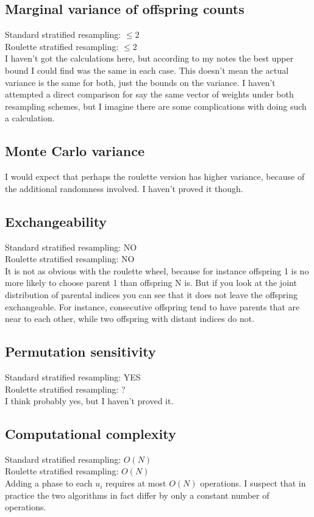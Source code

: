 \documentclass[fleqn]{article}
\newcommand{\1}[1]{\mathbb{I}_{#1}}
\begin{document}
\subsection*{Marginal variance of offspring counts}
Standard stratified resampling: $\leq 2$\\
Roulette stratified resampling: $\leq 2$\\[5pt]
I haven't got the calculations here, but according to my notes the best upper bound I could find was the same in each case. This doesn't mean the actual variance is the same for both, just the bounds on the variance. I haven't attempted a direct comparison for say the same vector of weights under both resampling schemes, but I imagine there are some complications with doing such a calculation.


\subsection*{Monte Carlo variance}
I would expect that perhaps the roulette version has higher variance, because of the additional randomness involved. I haven't proved it though.


\subsection*{Exchangeability}
Standard stratified resampling: NO\\
Roulette stratified resampling: NO\\[5pt]
It is not as obvious with the roulette wheel, because for instance offspring 1 is no more likely to choose parent 1 than offspring N is. But if you look at the joint distribution of parental indices you can see that it does not leave the offspring exchangeable. For instance, consecutive offspring tend to have parents that are near to each other, while two offspring with distant indices do not.


\subsection*{Permutation sensitivity}
Standard stratified resampling: YES\\
Roulette stratified resampling: ?\\[5pt]
I think probably yes, but I haven't proved it.


\subsection*{Computational complexity}
Standard stratified resampling: $O(N)$\\
Roulette stratified resampling: $O(N)$\\[5pt]
Adding a phase to each $u_i$ requires at most $O(N)$ operations. I suspect that in practice the two algorithms in fact differ by only a constant number of operations.
\end{document}
